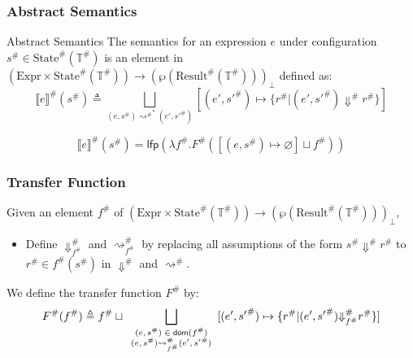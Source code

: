 \documentclass{beamer}
\newcommand*{\A}[1]{{#1}^{\#}}
\newcommand*{\Expr}{\text{Expr}}
\newcommand*{\Time}{\mathbb{T}}
\newcommand*{\ATime}{\A{\Time}}
\newcommand*{\AState}[1]{\A{\text{State}}({#1})}
\newcommand*{\AResult}[1]{\A{\text{Result}}({#1})}
\newcommand*{\sembracket}[1]{\lBrack{#1}\rBrack}
\begin{document}
\begin{frame}[c]
  \frametitle{Abstract Semantics}
  \begin{block}{Abstract Semantics}
    The semantics for an expression $e$ under configuration $\A{s}\in\AState{\ATime}$ is an element in $(\Expr\times\AState{\ATime})\rightarrow(\wp(\AResult{\ATime}))_{\bot}$ defined as:
    \[
      \A{\sembracket{e}}(\A{s})\triangleq\bigsqcup_{(e,\A{s}){\A\rightsquigarrow}^{*}(e',\A{s'})}[(e',\A{s'})\mapsto\{\A{r}|(e',\A{s'})\A\Downarrow \A{r}\}]
    \]
  \end{block}

  \[
    \A{\sembracket{e}}(\A{s})=\mathsf{lfp}(\lambda \A{f}.\A{F}([(e,\A{s})\mapsto\varnothing]\sqcup\A{f}))
  \]
\end{frame}
\begin{frame}[c]
  \frametitle{Transfer Function}
  \begin{definition}
    Given an element $\A{f}$ of $(\Expr\times\AState{\ATime})\rightarrow(\wp(\AResult{\ATime}))_{\bot}$,

    \begin{itemize}
      \item Define $\A{\Downarrow}_{\A{f}}$ and $\A{\rightsquigarrow}_{\A{f}}$ by replacing all assumptions of the form $\A{s}\A\Downarrow\A{r}$ to $\A{r}\in\A{f}(\A{s})$ in $\A\Downarrow$ and $\A\rightsquigarrow$.
    \end{itemize}

    We define the transfer function $\A{F}$ by:
    \[
      \A{F}(\A{f})\triangleq\A{f}\sqcup\bigsqcup_{
      \scriptsize
      \begin{array}{c}
        (e,\A{s})\in\mathsf{dom}(\A{f}) \\
        (e,\A{s})\A{\rightsquigarrow}_{\A{f}}(e',\A{s'})
      \end{array}}[(e',\A{s'})\mapsto\{\A{r}|(e',\A{s'})\A{\Downarrow}_{\A{f}}\A{r}\}]
    \]
  \end{definition}
\end{frame}
\end{document}
